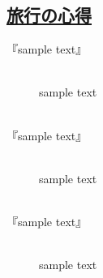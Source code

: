 \begin{center}
	\section*{\underline{\fontsize{45pt}{20pt}\selectfont 旅行の心得}}
\end{center}
\vspace{1.5cm}
\begin{description}
	\item[\huge 『sample text』]\mbox{}\\
	sample text\\\\
	\item[\huge 『sample text』]\mbox{}\\
	sample text\\\\
	\item[\huge 『sample text』]\mbox{}\\
	sample text
\end{description}